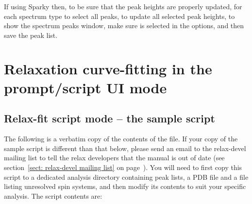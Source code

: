 If using Sparky then, to be sure that the peak heights are properly updated, for each spectrum type  to select all peaks,  to update all selected peak heights,  to show the spectrum peaks window, make sure  is selected in the options, and then save the peak list.



\section{Relaxation curve-fitting in the prompt/script UI mode}



\subsection{Relax-fit script mode -- the sample script}

The following is a verbatim copy of the contents of the  file.  If your copy of the sample script is different than that below, please send an email to the relax-devel mailing list to tell the relax developers that the manual is out of date (see section~\ref{sect: relax-devel mailing list} on page~\pageref{sect: relax-devel mailing list}).  You will need to first copy this script to a dedicated analysis directory containing peak lists, a PDB file and a file listing unresolved spin systems, and then modify its contents to suit your specific analysis.  The script contents are:

